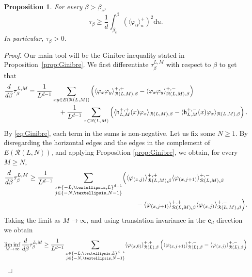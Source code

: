 \documentclass[11pt,a4paper]{article}
\newtheorem{proposition}[theorem]{Proposition}
\theoremstyle{definition}
\numberwithin{equation}{section}
\newcommand\cR{\mathcal{R}}
\begin{document}
\begin{proposition}\label{prop: surface tension positive}
For every $\beta > \beta_c$, 
\begin{equation}
\tau_\beta \geq \frac 1d \int_{\beta_c}^\beta \left( \langle \varphi_0 \rangle_u^+ \right)^2 \mathrm{d}u.
\end{equation}
In particular, $\tau_\beta > 0$.
\end{proposition}
\begin{proof}
Our main tool will be the Ginibre inequality stated in Proposition~\ref{prop:Ginibre}.
We first differentiate $\tau^{L,M}_\beta$ with respect to $\beta$ to get that
\begin{align}
\begin{split}
\frac{\rm d}{\rm d\beta} \tau^{L,M}_\beta =  \frac{1}{L^{d-1}}& \sum_{xy\in E(\cR(L,M))} \left(\langle \varphi_x\varphi_y \rangle^{+,+}_{\cR(L,M),\beta} - \langle \varphi_x\varphi_y \rangle^{+,-}_{\cR(L,M),\beta}\right)
\\
&\quad +\frac{1}{L^{d-1}}\sum_{x\in \cR(L,M)}\left( \langle \mathsf h^{+,+}_{L,M}(x)\varphi_x \rangle_{\mathcal R(L,M),\beta} - \langle \mathsf h^{+,-}_{L,M}(x)\varphi_x \rangle_{\mathcal R(L,M),\beta} \right).
\end{split}
\end{align}
By \eqref{eq:Ginibre}, each term in the sums is non-negative. Let us fix some $N\geq 1$. By disregarding the horizontal edges and the edges in the complement of $E(\mathcal{R}(L,N))$, and applying Proposition \ref{prop:Ginibre}, we obtain, for every $M\geq N$,
\begin{align*}
\frac{\rm d}{\rm d\beta} \tau^{L,M}_\beta \geq  \frac{1}{L^{d-1}} \sum_{\substack{ x\in \{-L,\ldots,L\}^{d-1}\\ j\in\{-N,\ldots,N-1\}}} & \Big(\langle \varphi_{(x,j)} \rangle^{+,+}_{\cR(L,M),\beta} \langle \varphi_{(x,j+1)} \rangle^{+,-}_{\cR(L,M),\beta}\\
&\qquad- \langle \varphi_{(x,j+1)}\rangle^{+,+}_{\cR(L,M),\beta} \langle \varphi_{(x,j)} \rangle^{+,-}_{\cR(L,M),\beta}\Big).
\end{align*}
Taking the limit as $M\to \infty$, and using translation invariance in the $\mathbf{e}_d$ direction we obtain
\begin{align*}
\liminf_{M\to\infty}\frac{\rm d}{\rm d\beta} \tau^{L,M}_\beta &\geq  \frac{1}{L^{d-1}} \sum_{\substack{ x\in \{-L,\ldots,L\}^{d-1}\\ j\in\{-N,\ldots,N-1\}}}  \langle \varphi_{(x,0)} \rangle^{+,+}_{\cR(L),\beta} \left( \langle \varphi_{(x,j+1)} \rangle^{+,-}_{\cR(L),\beta} - \langle \varphi_{(x,j)} \rangle^{+,-}_{\cR(L),\beta} \right) \\

\end{align*}
\end{proof}
\end{document}
